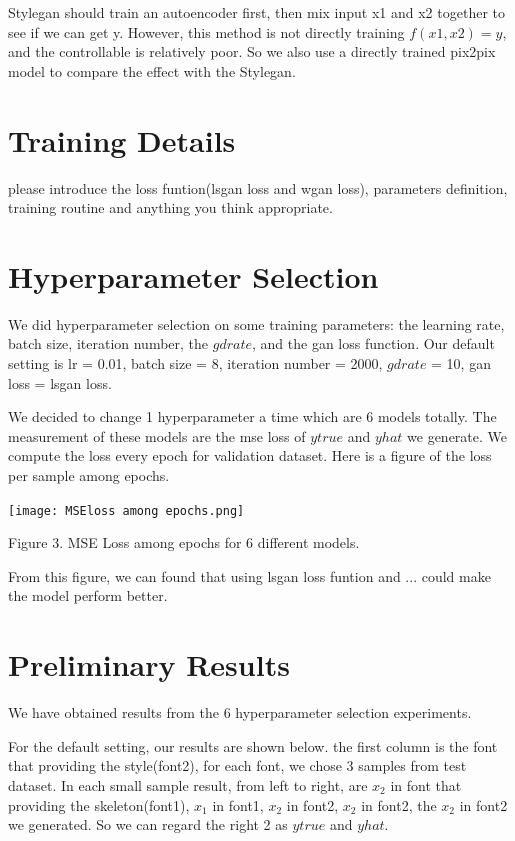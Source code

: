 \documentclass[letterpaper]{article}
\begin{document}
Stylegan should train an autoencoder first, then mix input x1 and x2 together to see if we can get y. However, this method is not directly training $f(x1,x2)=y$, and the controllable is relatively poor. So we also use a directly trained pix2pix model to compare the effect with the Stylegan.


\section{Training Details}
please introduce the loss funtion(lsgan loss and wgan loss), parameters definition, training routine and anything you think appropriate.

\section{Hyperparameter Selection}
We did hyperparameter selection on some training parameters: the learning rate, batch size, iteration number, the $gdrate$, and the gan loss function. Our default setting is lr = 0.01, batch size = 8, iteration number = 2000,  $gdrate$ = 10, gan loss = lsgan loss.

We decided to change 1 hyperparameter a time which are 6 models totally. The measurement of these models are the mse loss of $y true$ and $y hat$ we generate. We compute the loss every epoch for validation dataset. Here is a figure of the loss per sample among epochs.


\begin{center}
    \texttt{[image: MSEloss among epochs.png]}

    Figure 3. MSE Loss among epochs for 6 different models.
\end{center}

From this figure, we can found that using lsgan loss funtion and ... could make the model perform better.

\section{Preliminary Results}
We have obtained results from the 6 hyperparameter selection experiments.

For the default setting, our results are shown below. the first column is the font that providing the style(font2), for each font, we chose 3 samples from test dataset. In each small sample result, from left to right, are $x_2$ in font that providing the skeleton(font1), $x_1$ in font1, $x_2$ in font2, $x_2$ in font2, the $x_2$ in font2 we generated. So we can regard the right 2 as $y true$ and $y hat$.
\end{document}
